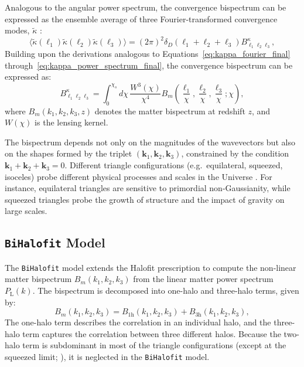 Analogous to the angular power spectrum, the convergence bispectrum can be expressed as the ensemble average of three Fourier-transformed convergence modes, \( \tilde{\kappa} \) \citep{2005PhRvD..72h3001D}:
\begin{equation}
    \langle \tilde{\kappa}(\mathbf{\ell}_1) \tilde{\kappa}(\mathbf{\ell}_2) \tilde{\kappa}(\mathbf{\ell}_3) \rangle = (2\pi)^2 \delta_{D}(\mathbf{\ell}_1 + \mathbf{\ell}_2 + \mathbf{\ell}_3) B^\kappa_{\ell_1 \ell_2 \ell_3},
    \label{eq:convergence_bispectrum_def}
\end{equation}
Building upon the derivations analogous to Equations~\eqref{eq:kappa_fourier_final} through~\eqref{eq:kappa_power_spectrum_final}, the convergence bispectrum can be expressed as:
\begin{equation}
    B_{\ell_1 \ell_2 \ell_3}^\kappa = \int_0^{\chi_s} d\chi \, \frac{W^3(\chi)}{\chi^4} B_m\left( \frac{\ell_1}{\chi}, \frac{\ell_2}{\chi}, \frac{\ell_3}{\chi}; \chi \right),
    \label{eq:convergence_bispectrum}
\end{equation}
where \( B_m(k_1, k_2, k_3, z) \) denotes the matter bispectrum at redshift \( z \), and \( W(\chi) \) is the lensing kernel. 

The bispectrum depends not only on the magnitudes of the wavevectors but also on the shapes formed by the triplet \( (\boldsymbol{k}_1, \boldsymbol{k}_2, \boldsymbol{k}_3) \), constrained by the condition \( \boldsymbol{k}_1 + \boldsymbol{k}_2 + \boldsymbol{k}_3 = 0 \). Different triangle configurations (e.g.\, equilateral, squeezed, isoceles) probe different physical processes and scales in the Universe \citep{2005PhRvD..72h3001D}. For instance, equilateral triangles are sensitive to primordial non-Gaussianity, while squeezed triangles probe the growth of structure and the impact of gravity on large scales.

\subsection{\texttt{BiHalofit} Model}
The \texttt{BiHalofit} model \citep{2020ApJ...895..113T} extends the Halofit prescription to compute the non-linear matter bispectrum \( B_m(k_1, k_2, k_3) \) from the linear matter power spectrum \( P_{\mathrm{L}}(k) \). The bispectrum is decomposed into one-halo and three-halo terms, given by:
\begin{equation}
    B_m(k_1, k_2, k_3) = B_{\mathrm{1h}}(k_1, k_2, k_3) + B_{\mathrm{3h}}(k_1, k_2, k_3),
    \label{eq:bihalofit_model}
\end{equation}
The one-halo term describes the correlation in an individual halo, and the three-halo term captures the correlation between three different halos. Because the two-halo term is subdominant in most of the triangle configurations (except at the squeezed limit; \citealt{2011A&A...532A...4V}), it is neglected in the \texttt{BiHalofit} model.

